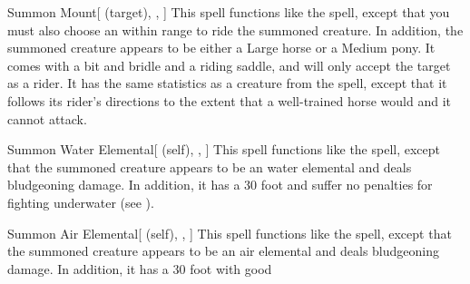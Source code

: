 \lowercase{\hypertarget{spell:Summon Mount}{}}\label{spell:Summon Mount}
\begin{attuneability}[Rank 3]{\hypertarget{spell:Summon Mount}{Summon Mount}}[ (target), , ]
This spell functions like the  spell, except that you must also choose an  within \rngmed range to ride the summoned creature.
In addition, the summoned creature appears to be either a Large horse or a Medium pony.
It comes with a bit and bridle and a riding saddle, and will only accept the target as a rider.
It has the same statistics as a creature from the  spell, except that it follows its rider's directions to the extent that a well-trained horse would and it cannot attack.
\end{attuneability}
\vspace{0.25em}



\lowercase{\hypertarget{spell:Summon Water Elemental}{}}\label{spell:Summon Water Elemental}
\begin{attuneability}[Rank 3]{\hypertarget{spell:Summon Water Elemental}{Summon Water Elemental}}[ (self), , ]
This spell functions like the  spell, except that the summoned creature appears to be an water elemental and deals bludgeoning damage.
In addition, it has a 30 foot  and suffer no penalties for fighting underwater (see ).
\end{attuneability}
\vspace{0.25em}



\lowercase{\hypertarget{spell:Summon Air Elemental}{}}\label{spell:Summon Air Elemental}
\begin{attuneability}[Rank 4]{\hypertarget{spell:Summon Air Elemental}{Summon Air Elemental}}[ (self), , ]
This spell functions like the  spell, except that the summoned creature appears to be an air elemental and deals bludgeoning damage.
In addition, it has a 30 foot  with good 
\end{attuneability}
\vspace{0.25em}



